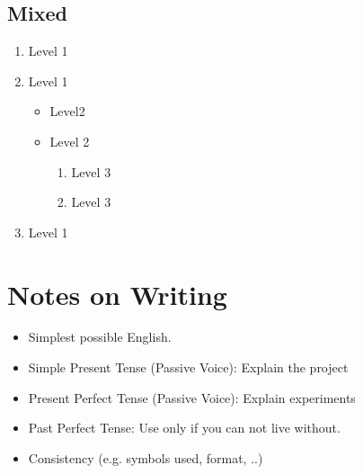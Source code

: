  
 \subsection{Mixed}
 
 \begin{enumerate}
  \item Level 1
 \item Level 1
  		\begin{itemize}
  		 \item Level2
  		 \item Level 2
  		 		\begin{enumerate}
  		 		\item Level 3
  		 		\item Level 3
  				\end{enumerate}
  		\end{itemize}
 \item Level 1
 \end{enumerate}

\section{Notes on Writing}
\begin{itemize}
 \item Simplest possible English.
 \item Simple Present Tense (Passive Voice): Explain the project
 \item Present Perfect Tense (Passive Voice): Explain experiments
 \item Past Perfect Tense: Use only if you can not live without.
 \item Consistency (e.g. symbols used, format, ..)
\end{itemize}

